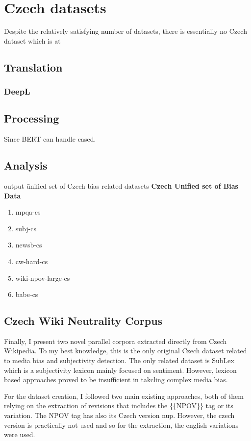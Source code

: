 \chapter{Czech datasets}
Despite the relatively satisfying number of datasets, there is essentially no Czech dataset which is at 
\section{Translation}
\subsection{DeepL}
\section{Processing}
Since BERT can handle cased.
\section{Analysis}
output \= unified set of Czech bias related datasets
\textbf{Czech Unified set of Bias Data}
\begin{enumerate}
    \item mpqa-cs
    \item subj-cs
    \item newsb-cs
    \item cw-hard-cs
    \item wiki-npov-large-cs
    \item babe-cs
\end{enumerate}

\newpage

\section{Czech Wiki Neutrality Corpus}
Finally, I present two novel parallel corpora extracted directly from Czech Wikipedia. To my best knowledge, this is the only original Czech dataset related to media bias and subjectivity detection. The only related dataset is SubLex which is a subjectivity lexicon mainly focused on sentiment. However, lexicon based approaches proved to be insufficient in takcling complex media bias.

For the dataset creation, I followed two main existing approaches, both of them relying on the extraction of revisions that includes the \{\{NPOV\}\} tag or its variation. The NPOV tag has also its Czech version \Gls{nup}. However, the czech version is practically not used and so for the extraction, the english variations were used.

